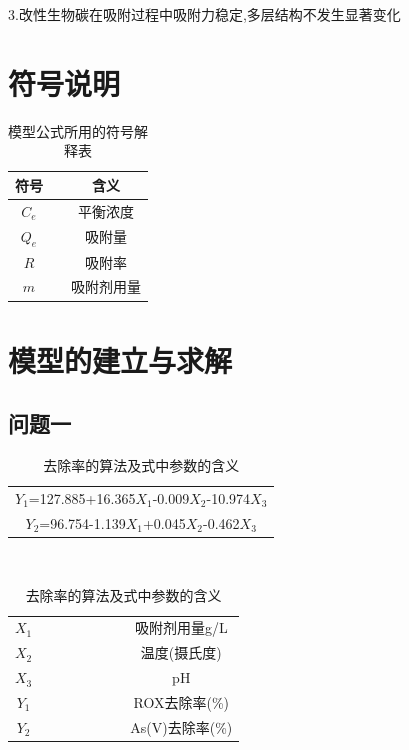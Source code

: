 \documentclass[AutoFakeBold]{ctexart}
\begin{document}
		3.改性生物碳在吸附过程中吸附力稳定,多层结构不发生显著变化
	
	
	

	
	

	
	\section{符号说明}

	\begin{table}[H]
		\centering
		\begin{tabular}{ccc}
			\toprule
			符号 & &含义 \\
			\midrule
			$C_e$ & & 平衡浓度 \\
			$Q_e$ & & 吸附量 \\
			$R$ & & 吸附率 \\
			$m$ & & 吸附剂用量 \\
			\bottomrule
		\end{tabular}
		\caption{模型公式所用的符号解释表}
		\label{tab:example}
	\end{table}
	
	
	\section{模型的建立与求解}
	
	\subsection{问题一}
	

	
	\begin{table}[H]
		\centering
		\begin{tabular}[H]{c}
			\toprule
			$Y_1$=127.885+16.365$X_1$-0.009$X_2$-10.974$X_3$ \\
			$Y_2$=96.754-1.139$X_1$+0.045$X_2$-0.462$X_3$\\
			\midrule
		\end{tabular}\\
		\begin{tabular}[H]{cccccccc}
			$X_1$  &   &   &  && &&  \qquad  吸附剂用量g/L  \\
			$X_2$ &   &   &  &&  & & \qquad 温度(摄氏度)   \\
			$X_3$ &   &   &  && &  & \qquad pH   \\
			$Y_1$ &  &   &  & && &  \qquad ROX去除率(\%)   \\
			$Y_2$  & & &  &&  & & \quad As(V)去除率(\%)  \\
			\bottomrule
			\midrule
		\end{tabular}\\
			\caption{去除率的算法及式中参数的含义}
		\label{tab:example}
	\end{table}
	
\end{document}
